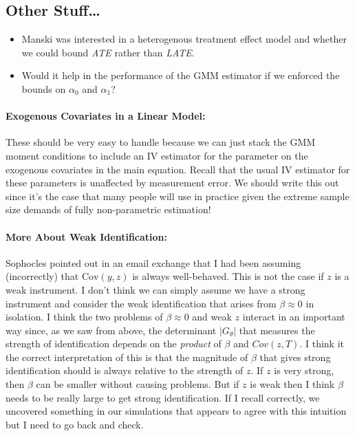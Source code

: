 \documentclass[12pt]{article}
\begin{document}
\subsection{Other Stuff\ldots}

\begin{itemize}
  \item Manski was interested in a heterogenous treatment effect model and whether we could bound \emph{ATE} rather than \emph{LATE}.
  \item Would it help in the performance of the GMM estimator if we enforced the bounds on $\alpha_0$ and $\alpha_1$?
\end{itemize}



\paragraph{Exogenous Covariates in a Linear Model:} These should be very easy to handle because we can just stack the GMM moment conditions to include an IV estimator for the parameter on the exogenous covariates in the main equation.
Recall that the usual IV estimator for these parameters is unaffected by measurement error.
We should write this out since it's the case that many people will use in practice given the extreme sample size demands of fully non-parametric estimation!

\paragraph{More About Weak Identification:}
Sophocles pointed out in an email exchange that I had been assuming (incorrectly) that $\mbox{Cov}(y,z)$ is always well-behaved.
This is not the case if $z$ is a weak instrument.
I don't think we can simply assume we have a strong instrument and consider the weak identification that arises from $\beta \approx 0$ in isolation.
I think the two problems of $\beta \approx 0$ and weak $z$ interact in an important way since, as we saw from above, the determinant $|G_\theta|$ that measures the strength of identification depends on the \emph{product} of $\beta$ and $Cov(z,T)$.
I think it the correct interpretation of this is that the magnitude of $\beta$ that gives strong identification should is always relative to the strength of $z$.
If $z$ is very strong, then $\beta$ can be smaller without causing problems.
But if $z$ is weak then I think $\beta$ needs to be really large to get strong identification.
If I recall correctly, we uncovered something in our simulations that appears to agree with this intuition but I need to go back and check.
\end{document}
